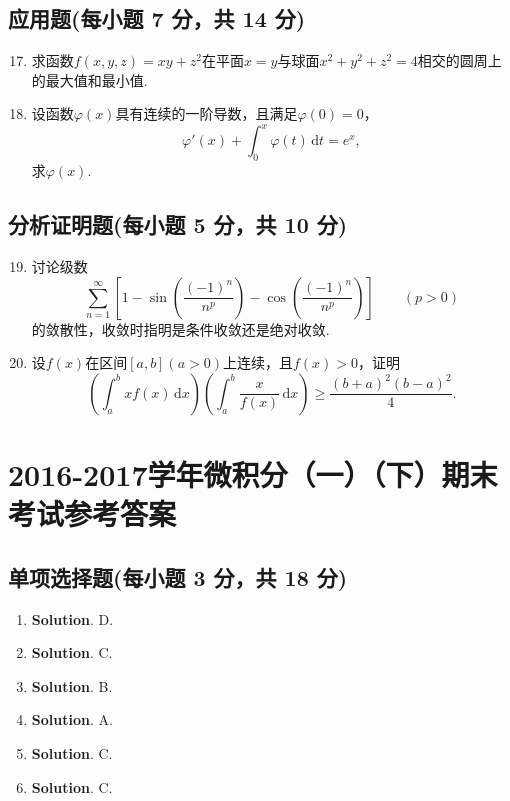 \documentclass[../Main.tex]{subfiles}
\begin{document}
\section{应用题(每小题 7 分，共 14 分)}
\begin{enumerate}
    \setcounter{enumi}{16}
    \item 求函数$f(x,y,z)=xy+z^{2}$在平面$x=y$与球面$x^{2}+y^{2}+z^{2}=4$相交的圆周上的最大值和最小值.
          \vspace{12em}

    \item 设函数$\varphi(x)$具有连续的一阶导数，且满足$\varphi(0)=0$，
          \[
              \varphi'(x)+\int_{0}^{x}\varphi(t)\,\mathrm{d}t=e^{x},
          \]
          求$\varphi(x)$.
          \vspace{12em}
\end{enumerate}

\section{分析证明题(每小题 5 分，共 10 分)}
\begin{enumerate}
    \setcounter{enumi}{18}
    \item 讨论级数
          \[
              \sum_{n=1}^{\infty}\left[1-\sin\left(\frac{(-1)^{n}}{n^{p}}\right)-\cos\left(\frac{(-1)^{n}}{n^{p}}\right)\right]\qquad (p>0)
          \]
          的敛散性，收敛时指明是条件收敛还是绝对收敛.
          \vspace{15em}

    \item 设$f(x)$在区间$[a,b](a>0)$上连续，且$f(x)>0$，证明
          \[
              \left(\int_{a}^{b}xf(x)\,\mathrm{d}x\right)\left(\int_{a}^{b}\frac{x}{f(x)}\,\mathrm{d}x\right)\geq\frac{(b+a)^{2}(b-a)^{2}}{4}.
          \]
          \vspace{15em}
\end{enumerate}

\chapter{2016-2017学年微积分（一）（下）期末考试参考答案}
\section{单项选择题(每小题 3 分，共 18 分)}
\begin{enumerate}
    \item \textbf{Solution}. D.
    \item \textbf{Solution}. C.
    \item \textbf{Solution}. B.
    \item \textbf{Solution}. A.
    \item \textbf{Solution}. C.
    \item \textbf{Solution}. C.
\end{enumerate}
\end{document}
